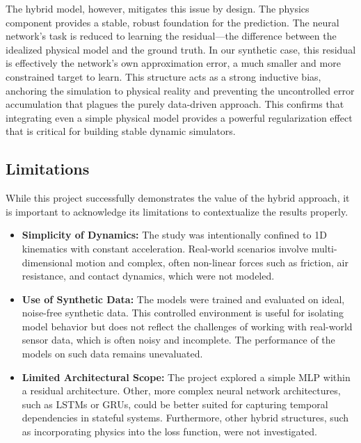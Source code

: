 \documentclass[conference]{IEEEtran}
\begin{document}
The hybrid model, however, mitigates this issue by design. The physics component provides a stable, robust foundation for the prediction. The neural network's task is reduced to learning the residual—the difference between the idealized physical model and the ground truth. In our synthetic case, this residual is effectively the network's own approximation error, a much smaller and more constrained target to learn. This structure acts as a strong inductive bias, anchoring the simulation to physical reality and preventing the uncontrolled error accumulation that plagues the purely data-driven approach. This confirms that integrating even a simple physical model provides a powerful regularization effect that is critical for building stable dynamic simulators.

\subsection{Limitations}
While this project successfully demonstrates the value of the hybrid approach, it is important to acknowledge its limitations to contextualize the results properly.
\begin{itemize}
    \item \textbf{Simplicity of Dynamics:} The study was intentionally confined to 1D kinematics with constant acceleration. Real-world scenarios involve multi-dimensional motion and complex, often non-linear forces such as friction, air resistance, and contact dynamics, which were not modeled.
    \item \textbf{Use of Synthetic Data:} The models were trained and evaluated on ideal, noise-free synthetic data. This controlled environment is useful for isolating model behavior but does not reflect the challenges of working with real-world sensor data, which is often noisy and incomplete. The performance of the models on such data remains unevaluated.
    \item \textbf{Limited Architectural Scope:} The project explored a simple MLP within a residual architecture. Other, more complex neural network architectures, such as LSTMs or GRUs, could be better suited for capturing temporal dependencies in stateful systems. Furthermore, other hybrid structures, such as incorporating physics into the loss function, were not investigated.
\end{itemize}
\end{document}
